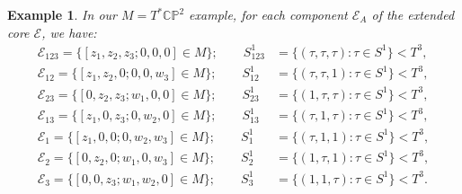 \documentclass[11pt]{amsart}
\newtheorem{example}{Example}
\newcommand{\PP}{\mathbb{P}}
\newcommand{\CC}{\mathbb{C}}
\newcommand{\mcE}{\mathcal{E}}
\begin{document}
\begin{example}
	In our $M = T^{\ast}\CC\PP^{2}$ example, for each component $\mcE_{A}$ of the extended core $\mcE$, we have:
	\begin{equation*}
		\begin{split}
			\mcE_{123} = \{ [z_{1}, z_{2}, z_{3}; 0, 0, 0] \in M \}; \qquad S_{123}^{1} &= \{(\tau, \tau, \tau) : \tau \in S^{1} \} < T^{3}, \\
			\mcE_{12} = \{ [z_{1}, z_{2}, 0; 0, 0, w_{3}] \in M \}; \qquad S_{12}^{1} &= \{(\tau, \tau, 1) : \tau \in S^{1} \} < T^{3}, \\
			\mcE_{23} = \{ [0, z_{2}, z_{3}; w_{1}, 0, 0] \in M \}; \qquad S_{23}^{1} &= \{(1, \tau, \tau) : \tau \in S^{1} \} < T^{3}, \\
			\mcE_{13} = \{ [z_{1}, 0, z_{3}; 0, w_{2}, 0] \in M \}; \qquad S_{13}^{1} &= \{(\tau, 1, \tau) : \tau \in S^{1} \} < T^{3}, \\
			\mcE_{1} = \{ [z_{1}, 0, 0; 0, w_{2}, w_{3}] \in M \}; \qquad S_{1}^{1} &= \{(\tau, 1, 1) : \tau \in S^{1} \} < T^{3}, \\
			\mcE_{2} = \{ [0, z_{2}, 0; w_{1}, 0, w_{3}] \in M \}; \qquad S_{2}^{1} &= \{(1, \tau, 1) : \tau \in S^{1} \} < T^{3}, \\
			\mcE_{3} = \{ [0, 0, z_{3}; w_{1}, w_{2}, 0] \in M \}; \qquad S_{3}^{1} &= \{(1, 1, \tau) : \tau \in S^{1} \} < T^{3}. 
		\end{split}
	\end{equation*}
\end{example}



























\providecommand{\bysame}{\leavevmode\hbox to3em{\hrulefill}\thinspace}
\providecommand{\href}[2]{#2}



\end{document}
